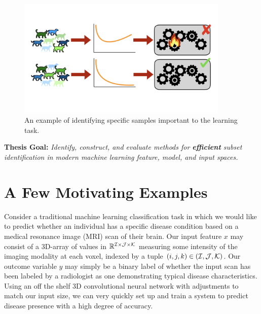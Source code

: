 \begin{figure}
    \centering
    \includegraphics[trim={0 4.5cm 0 4cm},clip,width=0.9\textwidth]{1_intro/figs/sample_select.png}
    \caption[Visualization of sample selection]{An example of identifying specific samples important to the learning task.}
    \label{fig:sample_select}
\end{figure}

\begin{mdframed}[style=MyFrame]
\textbf{ Thesis Goal: }
\em Identify, construct, and evaluate methods for \textbf{efficient} subset identification in modern machine learning feature, model, and input spaces.
\end{mdframed}

\section{A Few Motivating Examples}
Consider a traditional machine learning classification task in which we would like to predict whether an individual has a specific disease condition based on a medical resonance image (MRI) scan of their brain. Our input feature $x$ may consist of a 3D-array of values in $\mathbb{R}^{\mathcal{I}\times \mathcal{J}\times \mathcal{K}}$ measuring some intensity of the imaging modality at each voxel, indexed by a tuple $(i,j,k) \in (\mathcal{I},\mathcal{J},\mathcal{K})$.
Our outcome variable $y$ may simply be a binary label of whether the input scan has been labeled by a radiologist as one demonstrating typical disease characteristics.
Using an off the shelf 3D convolutional neural network with adjustments to match our input size, we can very quickly set up and train a system to predict disease presence with a high degree of accuracy.


